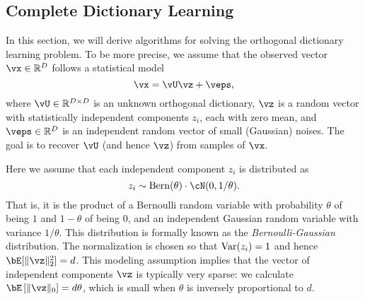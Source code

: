 \documentclass[../../book-main.tex]{subfiles}
\begin{document}
\subsection{Complete Dictionary Learning}
\label{sec:complete-dictionary}

In this section, we will derive algorithms for solving the orthogonal dictionary learning problem. To be more precise,  we assume that the observed vector $\vx \in \R^D$ follows a statistical model
\begin{equation}
    \vx = \vU \vz + \veps, 
    \label{eq:ica-model-ch2}
\end{equation}
where $\vU \in \R^{D \times D}$ is an unknown orthogonal dictionary, $\vz$ is a random vector with statistically independent components $z_i$, each with zero mean, and $\veps \in \R^D$ is an independent random vector of small (Gaussian) noises. The goal is to recover $\vU$ (and hence $\vz$) from samples of $\vx$.

Here we assume that each independent component $z_i$ is distributed as $$z_i \sim \mathrm{Bern}(\theta) \cdot \cN(0, 1/\theta).$$ That is, it is the product of a Bernoulli random variable with probability $\theta$ of being $1$ and $1-\theta$ of being $0$, and an independent Gaussian random variable with variance $1/\theta$. This distribution is formally known as the {\em Bernoulli-Gaussian} distribution. 
The normalization is chosen so that $\operatorname{Var}(z_i) = 1$ and hence $\bE[\norm{\vz}_2^2]=d$. 
This modeling assumption implies that the vector of independent components $\vz$ is typically very sparse: 
we calculate $\bE\left[\norm{\vz}_0\right] = d\theta$, which is small when $\theta$ is inversely proportional to $d$. 
\end{document}
